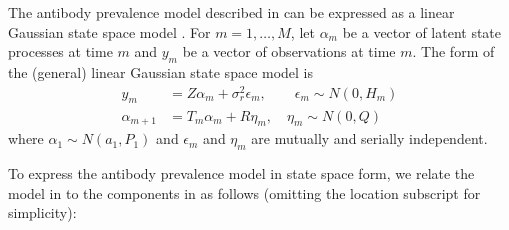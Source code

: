 The antibody prevalence model described in  can be expressed
as a linear Gaussian state space model \citep{durbin2012time}.
For $m = 1, \dots, M$, let $\alpha_m$ be a vector of
latent state processes at time $m$ and $y_m$ be a vector of
observations at time $m$. The form of the (general) linear Gaussian state space model is 
\begin{align}
y_m &= Z\alpha_m + \sigma^2_r\epsilon_m, \qquad \epsilon_m \sim N(0, H_m) \label{eq:ss1}\\
\alpha_{m+1} &= T_m\alpha_m + R\eta_m, \quad \eta_m \sim N(0, Q) \label{eq:ss2}
\end{align}
where $\alpha_1 \sim N(a_1, P_1)$ and 
$\epsilon_m$ and $\eta_m$ are mutually and serially independent.



To express the antibody prevalence model in state space form, we relate the
model in  to the components in
 as follows (omitting the location subscript for
simplicity):


